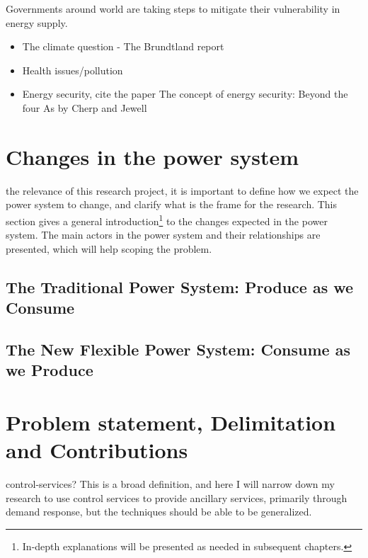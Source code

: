 Governments around world are taking steps to mitigate their vulnerability in energy supply.
\begin{itemize}
	\item The climate question - The Brundtland report
	\item Health issues/pollution
	\item Energy security, cite the paper The concept of energy security: Beyond the four As by Cherp and Jewell
\end{itemize}



\section{Changes in the power system}%
\label{sec:powsysdesc}
  the relevance of this research project, it is important to define how we expect the power system to change, and clarify what is the frame for the research. This section gives a general introduction\footnote{In-depth explanations will be presented as needed in subsequent chapters.} to the changes expected in the power system. The main actors in the power system and their relationships are presented, which will help scoping the problem.
\subsection*{The Traditional Power System: Produce as we Consume}
\label{sub:traditional}

\subsection*{The New Flexible Power System: Consume as we Produce}
\label{sub:future}


\section{Problem statement, Delimitation and Contributions} %
\label{sec:Funneling}
 control-services? This is a broad definition, and here I will  narrow down my research to use control services to provide ancillary services, primarily through demand response, but the techniques should be able to be generalized.

